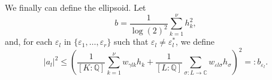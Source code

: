 %

%

We finally can define the ellipsoid. Let
\[b = \frac{1}{\log(2)^2}\sum_{k = 1}^{\nu} h_k^2,\]
and, for each $\varepsilon_l$ in $\{\varepsilon_1, \dots, \varepsilon_r\}$ such that $\varepsilon_l \neq \varepsilon_l^*$, we define
\[|a_l|^2 \leq \left( \frac{1}{[K:\mathbb{Q}]}\sum_{k = 1}^{\nu} w_{\gamma l k}h_k + \frac{1}{[L:\mathbb{Q}]}\sum_{\sigma:L\to \mathbb{C}} w_{\varepsilon l \sigma}h_{\sigma}\right)^2=:b_{\varepsilon_l}. \]

